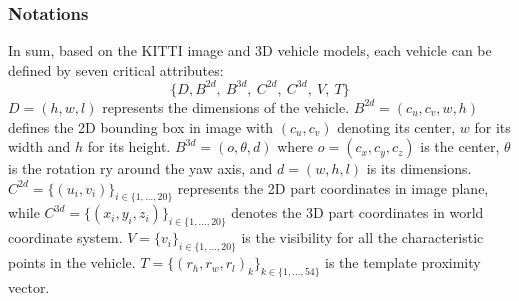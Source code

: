 \subsubsection{Notations}
In sum, based on the KITTI image and 3D vehicle models, each vehicle can be defined by seven critical attributes:
\[  \{D, B^{2d}, ~B^{3d}, ~C^{2d}, ~C^{3d}, ~V, ~T\}  \]
$D = (h, w, l)$ represents the dimensions of the vehicle. $B^{2d} = (c_u, c_v, w, h)$ defines the 2D bounding box in image with $(c_u, c_v)$ denoting its center,  $w$ for its width and $h$ for its height. $B^{3d} = (o, \theta, d)$ where $o = (c_x, c_y, c_z)$ is the center, $\theta$ is the rotation ry around the yaw axis, and $d = (w, h, l)$ is its dimensions. $C^{2d}  = \{(u_i, v_i)\}_{i \in \{1, ...,20\}}$ represents the 2D part coordinates in image plane, while $C^{3d}  = \{(x_i, y_i, z_i)\}_{i \in \{1, ...,20\}}$ denotes the 3D part coordinates in world coordinate system. $V = \{v_i\}_{i \in \{1, ...,20\}}$ is the visibility for all the characteristic points in the vehicle.  $T = \{{(r_{h},r_{w},r_{l})}_k\}_{k \in \{1, ...,54\}}$ is the template proximity vector.
